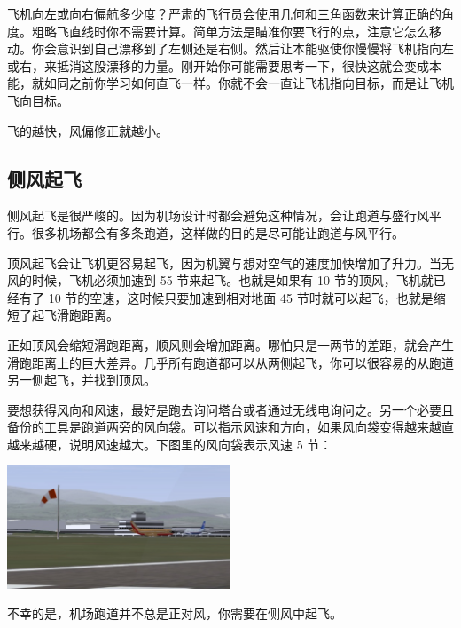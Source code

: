 飞机向左或向右偏航多少度？严肃的飞行员会使用几何和三角函数来计算正确的角度。粗略飞直线时你不需要计算。简单方法是瞄准你要飞行的点，注意它怎么移动。你会意识到自己漂移到了左侧还是右侧。然后让本能驱使你慢慢将飞机指向左或右，来抵消这股漂移的力量。刚开始你可能需要思考一下，很快这就会变成本能，就如同之前你学习如何直飞一样。你就不会一直让飞机指向目标，而是让飞机飞向目标。

飞的越快，风偏修正就越小。

\subsection{侧风起飞}
\label{sec:Swsw}

侧风起飞是很严峻的。因为机场设计时都会避免这种情况，会让跑道与盛行风平行。很多机场都会有多条跑道，这样做的目的是尽可能让跑道与风平行。

顶风起飞会让飞机更容易起飞，因为机翼与想对空气的速度加快增加了升力。当无风的时候，飞机必须加速到 55 节来起飞。也就是如果有 10 节的顶风，飞机就已经有了 10 节的空速，这时候只要加速到相对地面 45 节时就可以起飞，也就是缩短了起飞滑跑距离。

正如顶风会缩短滑跑距离，顺风则会增加距离。哪怕只是一两节的差距，就会产生滑跑距离上的巨大差异。几乎所有跑道都可以从两侧起飞，你可以很容易的从跑道另一侧起飞，并找到顶风。

要想获得风向和风速，最好是跑去询问塔台或者通过无线电询问之。另一个必要且备份的工具是跑道两旁的风向袋。可以指示风速和方向，如果风向袋变得越来越直越来越硬，说明风速越大。下图里的风向袋表示风速 5 节：

\begin{center}
\includegraphics[width=0.5\textwidth]{img/tut_46}
\end{center}

不幸的是，机场跑道并不总是正对风，你需要在侧风中起飞。

